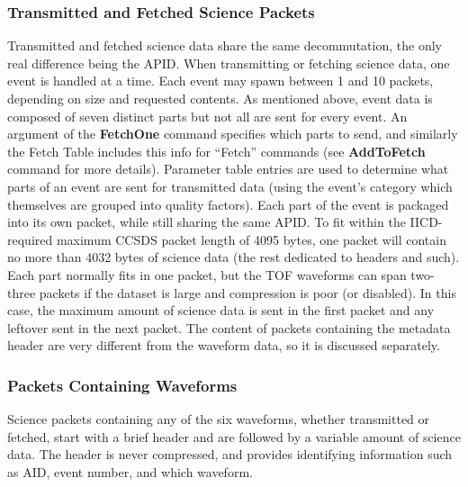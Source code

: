 \subsubsection{Transmitted and Fetched Science Packets}
Transmitted and fetched science data share the same decommutation, the only real difference being the APID.  When transmitting or fetching science data, one event is handled at a time. Each event may spawn between 1 and 10 packets, depending on size and requested contents. %
\newline
As mentioned above, event data is composed of seven distinct parts but not all are sent for every event.  An argument of the \textbf{FetchOne} command specifies which parts to send, and similarly the Fetch Table includes this info for “Fetch” commands (see \textbf{AddToFetch} command for more details).  Parameter table entries are used to determine what parts of an event are sent for transmitted data (using the event’s category which themselves are grouped into quality factors). %
Each part of the event is packaged into its own packet, while still sharing the same APID.  To fit within the IICD-required maximum CCSDS packet length of 4095 bytes, one packet will contain no more than 4032 bytes of science data (the rest dedicated to headers and such). Each part normally fits in one packet, but the TOF waveforms can span two-three packets if the dataset is large and compression is poor (or disabled). In this case, the maximum amount of science data is sent in the first packet and any leftover sent in the next packet.
The content of packets containing the metadata header are very different from the waveform data, so it is discussed separately.\newline

\subsubsection{Packets Containing Waveforms}
Science packets containing any of the six waveforms, whether transmitted or fetched, start with a brief header and are followed by a variable amount of science data.  The header is never compressed, and provides identifying information such as AID, event number, and which waveform.  \newline
\label{wavepack}


